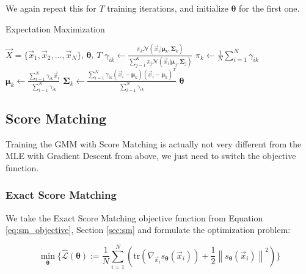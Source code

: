 We again repeat this for $T$ training iterations, and initialize $\boldsymbol{\theta}$ for the first one.  \\

\begin{algorithm}
    \caption{Expectation Maximization}
    \label{alg:em_gmm}
    \begin{algorithmic}[1]  
        \Require $\vec X = \{\vec x_1, \vec x_2, ..., \vec x_N\}$, $\boldsymbol{\theta}$, $T$
                    \State $\gamma_{ik} \gets \frac{\pi_k \mathcal{N}(\vec{x}_i|\boldsymbol{\mu}_k, \boldsymbol{\Sigma}_k)}{\sum_{j=1}^{K} \pi_j \mathcal{N}(\vec{x}_i|\boldsymbol{\mu}_j, \boldsymbol{\Sigma}_j)}$
                \EndFor
            \EndFor
                \State $\pi_k \gets \frac{1}{N} \sum_{i=1}^{N} \gamma_{ik}$
                \State $\boldsymbol{\mu}_k \gets \frac{\sum_{i=1}^{N} \gamma_{ik} \vec{x}_i}{\sum_{i=1}^{N} \gamma_{ik}}$
                \State $\boldsymbol{\Sigma}_k \gets \frac{\sum_{i=1}^{N} \gamma_{ik} (\vec{x}_i - \boldsymbol{\mu}_k)(\vec{x}_i - \boldsymbol{\mu}_k)^T}{\sum_{i=1}^{N} \gamma_{ik}}$
            \EndFor
        \EndFor
        \State \Return $\boldsymbol{\theta}$
    \end{algorithmic}
\end{algorithm}

\newpage
\subsection{Score Matching}
\label{sec:gmm_sm}

Training the GMM with Score Matching is actually not very different from the MLE with Gradient Descent from above, we just need 
to switch the objective function.  

\subsubsection{Exact Score Matching}

We take the Exact Score Matching objective function from Equation \ref{eq:sm_objective}, Section \ref{sec:sm} and formulate the optimization problem:

\begin{equation}
    \min_{\substack{\boldsymbol{\theta}}} \{ \hat{\mathcal{L}}(\boldsymbol{\theta}) := \frac{1}{N} \sum_{i=1}^{N} \left(\text{tr} \left( \nabla_{\vec x_i} s_{\boldsymbol{\theta}}(\vec x_i) \right) + \frac{1}{2} \left\| s_{\boldsymbol{\theta}}(\vec x_i) \right\|^2 \right) \}
    \label{eq:sm_optimization_problem}
\end{equation}

